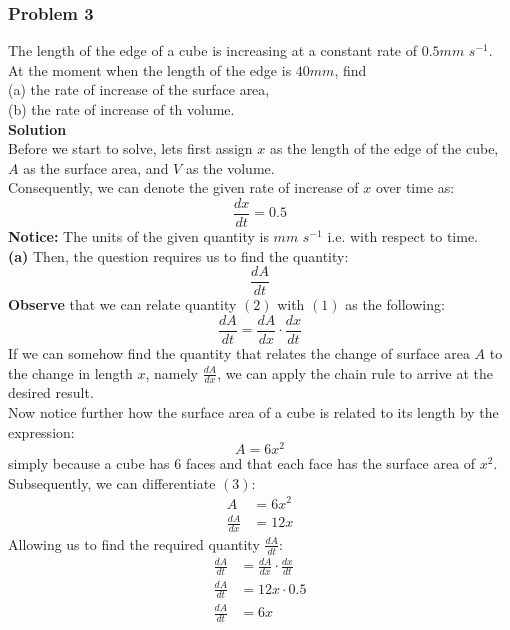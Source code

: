 \documentclass[hidelinks, a4paper, 12pt]{article}
\newcommand{\bd}{\textbf}
\newcommand{\n}{\\[\baselineskip]}
\begin{document}
            \subsubsection{Problem 3}
                The length of the edge of a cube is increasing at a constant rate of $0.5mm$ $s^{-1}$. At the moment when the length of the 
                edge is $40 mm$, find\n
                (a) the rate of increase of the surface area,\n
                (b) the rate of increase of th volume.\n
                \bd{Solution}\n
                Before we start to solve, lets first assign $x$ as the length of the edge of the cube, $A$ as the surface area, and $V$ as the volume.\n
                Consequently, we can denote the given rate of increase of $x$ over time as:
                \begin{equation}
                    \frac{dx}{dt} = 0.5
                \end{equation}
                \bd{Notice:} The units of the given quantity is $mm$ $s^{-1}$ i.e. with respect to time.\n
                \bd{(a)} Then, the question requires us to find the quantity:
                \begin{equation}
                    \frac{dA}{dt}
                \end{equation}
                \bd{Observe} that we can relate quantity $(2)$ with $(1)$ as the following:
                \[\frac{dA}{dt} = \frac{dA}{dx} \cdot \frac{dx}{dt}\]
                If we can somehow find the quantity that relates the change of surface area $A$ to the change in length $x$, namely $\frac{dA}{dx}$, we can apply the chain rule
                to arrive at the desired result.\n
                Now notice further how the surface area of a cube is related to its length by the expression:
                \begin{equation}
                    A = 6x^2
                \end{equation}
                simply because a cube has 6 faces and that each face has the surface area of $x^2$.\n
                Subsequently, we can differentiate $(3)$:
                \[\begin{split}
                    A &= 6x^2\\
                    \frac{dA}{dx} &= 12x
                \end{split}\]
                Allowing us to find the required quantity $\frac{dA}{dt}$:
                \[\begin{split}
                    \frac{dA}{dt} &= \frac{dA}{dx} \cdot \frac{dx}{dt}\\
                    \frac{dA}{dt} &= 12x \cdot 0.5\\
                    \frac{dA}{dt} &= 6x
                \end{split}\]
\end{document}
